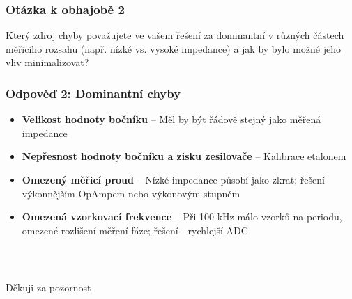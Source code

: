 \documentclass[
  12pt,
	t,
	aspectratio=1610,
	unicode,
]{beamer}
\begin{document}
\begin{frame}
	\frametitle{Otázka k obhajobě 2}
	\Large
	\begin{block}{}
		Který zdroj chyby považujete ve vašem řešení za dominantní v různých částech měřicího rozsahu (např. nízké vs. vysoké impedance) a jak by bylo možné jeho vliv minimalizovat?
	\end{block}
\end{frame}

\begin{frame}
	\frametitle{Odpověď 2: Dominantní chyby}
	\large
	\begin{itemize}
		\item \textbf{Velikost hodnoty bočníku} -- Měl by být řádově stejný jako měřená impedance
		\item \textbf{Nepřesnost hodnoty bočníku a zisku zesilovače} -- Kalibrace etalonem
		\item \textbf{Omezený měřicí proud} -- Nízké impedance působí jako zkrat; řešení výkonnějším OpAmpem nebo výkonovým stupněm
		\item \textbf{Omezená vzorkovací frekvence} -- Při 100 kHz málo vzorků na periodu, omezené rozlišení měření fáze; řešení - rychlejší ADC
	\end{itemize}
\end{frame}

\begin{frame}[c]
	\frametitle{\mbox{ }}
	\begin{center}
		{\Huge Děkuji za pozornost}
	\end{center}
\end{frame}
\end{document}
